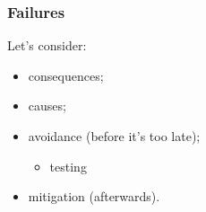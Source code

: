 \documentclass{beamer}
\newenvironment{changemargin}[1]{%
  \begin{list}{}{%
    \setlength{\topsep}{0pt}%
    \setlength{\leftmargin}{#1}%
    \setlength{\rightmargin}{1em}
    \setlength{\listparindent}{\parindent}%
    \setlength{\itemindent}{\parindent}%
    \setlength{\parsep}{\parskip}%
  }%
  \item[]}{\end{list}}
\begin{document}
\begin{frame}
  \frametitle{Failures}

\Large
\begin{changemargin}{2em}
  Let's consider:

\begin{itemize}
\item consequences;
\item causes; 
\item avoidance (before it's too late); 
\begin{itemize}
\item \Large testing
\end{itemize}
\item mitigation (afterwards).
\end{itemize}
\end{changemargin}
\end{frame}
\end{document}
